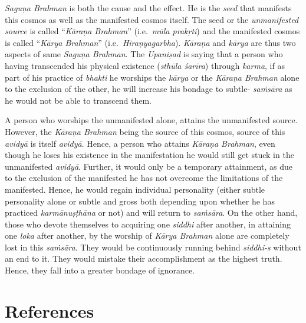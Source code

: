 \emph{Saguṇa Brahman} is both the cause and the effect. He is the \emph{seed} that manifests this cosmos as well as the manifested cosmos itself. The seed or the \emph{unmanifested source} is called ``\emph{Kāraṇa Brahman}'' (i.e.\ \emph{mūla prakṛti}) and the manifested cosmos is called ``\emph{Kārya Brahman}'' (i.e.\ \emph{Hiraṇyagarbha}). \emph{Kāraṇa} and \emph{kārya} are thus two aspects of same \emph{Saguṇa Brahman}. The \emph{Upaniṣad} is saying that a person who having transcended his physical existence (\emph{sthūla śarīra}) through \emph{karma}, if as part of his practice of \emph{bhakti} he worships the \emph{kārya} or the \emph{Kāraṇa Brahman} alone to the exclusion of the other, he will increase his bondage to subtle- \emph{saṁsāra} as he would not be able to transcend them.

A person who worships the unmanifested alone, attains the unmanifested source. However, the \emph{Kāraṇa Brahman} being the source of this cosmos, source of this \emph{avidyā} is itself \emph{avidyā}. Hence, a person who attains \emph{Kāraṇa Brahman}, even though he loses his existence in the manifestation he would still get stuck in the unmanifested \emph{avidyā}. Further, it would only be a temporary attainment, as due to the exclusion of the manifested he has not overcome the limitations of the manifested. Hence, he would regain individual personality (either subtle personality alone or subtle and gross both depending upon whether he has practiced \emph{karmānuṣṭhāna} or not) and will return to \emph{saṁsāra}. On the other hand, those who devote themselves to acquiring one \emph{siddhi} after another, in attaining one \emph{loka} after another, by the worship of \emph{Kārya Brahman} alone are completely lost in this \emph{saṁsāra}. They would be continuously running behind \emph{siddhi-s} without an end to it. They would mistake their accomplishment as the highest truth. Hence, they fall into a greater bondage of ignorance.

\section*{References}

